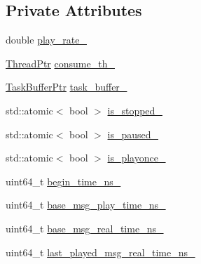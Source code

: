 \subsection*{Private Attributes}
\begin{DoxyCompactItemize}
\item 
double \hyperlink{classapollo_1_1cyber_1_1record_1_1PlayTaskConsumer_a911272033b43eb7a7fdba3799989fea3}{play\-\_\-rate\-\_\-}
\item 
\hyperlink{classapollo_1_1cyber_1_1record_1_1PlayTaskConsumer_afb48697be572010d788d1fa66e4aaa1f}{Thread\-Ptr} \hyperlink{classapollo_1_1cyber_1_1record_1_1PlayTaskConsumer_ad45dca736ccde70f941229975b666482}{consume\-\_\-th\-\_\-}
\item 
\hyperlink{classapollo_1_1cyber_1_1record_1_1PlayTaskConsumer_aaec143d18559ee0406ab272d8cbaab2e}{Task\-Buffer\-Ptr} \hyperlink{classapollo_1_1cyber_1_1record_1_1PlayTaskConsumer_acedbbb448f8819556afd8167db8b7b49}{task\-\_\-buffer\-\_\-}
\item 
std\-::atomic$<$ bool $>$ \hyperlink{classapollo_1_1cyber_1_1record_1_1PlayTaskConsumer_ad2a475e6bc6a738141aa55735b69de27}{is\-\_\-stopped\-\_\-}
\item 
std\-::atomic$<$ bool $>$ \hyperlink{classapollo_1_1cyber_1_1record_1_1PlayTaskConsumer_a578abc859d9a317153dc7b2c8a2c3b45}{is\-\_\-paused\-\_\-}
\item 
std\-::atomic$<$ bool $>$ \hyperlink{classapollo_1_1cyber_1_1record_1_1PlayTaskConsumer_a6295a09a99d209b4ef63340f3d36f2d2}{is\-\_\-playonce\-\_\-}
\item 
uint64\-\_\-t \hyperlink{classapollo_1_1cyber_1_1record_1_1PlayTaskConsumer_a5834ff486ca86361715b76111705476c}{begin\-\_\-time\-\_\-ns\-\_\-}
\item 
uint64\-\_\-t \hyperlink{classapollo_1_1cyber_1_1record_1_1PlayTaskConsumer_a10336c843c8c4ce540b03721f980016b}{base\-\_\-msg\-\_\-play\-\_\-time\-\_\-ns\-\_\-}
\item 
uint64\-\_\-t \hyperlink{classapollo_1_1cyber_1_1record_1_1PlayTaskConsumer_a1c17037c2c115ad0a754d7386dfd1015}{base\-\_\-msg\-\_\-real\-\_\-time\-\_\-ns\-\_\-}
\item 
uint64\-\_\-t \hyperlink{classapollo_1_1cyber_1_1record_1_1PlayTaskConsumer_af33ee43ed506b78a09f517386348ba95}{last\-\_\-played\-\_\-msg\-\_\-real\-\_\-time\-\_\-ns\-\_\-}
\end{DoxyCompactItemize}
